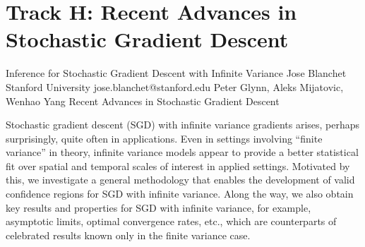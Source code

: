 \section{Track H: Recent Advances in Stochastic Gradient Descent}\newpage

\begin{talk}
  {Inference for Stochastic Gradient Descent with Infinite Variance}%
  {Jose Blanchet}%
  {Stanford University}%
  {jose.blanchet@stanford.edu}%
  {Peter Glynn, Aleks Mijatovic, Wenhao Yang}%
  {Recent Advances in Stochastic Gradient Descent}%
    
                
Stochastic gradient descent (SGD) with infinite variance gradients arises, perhaps surprisingly, quite often in applications. Even in settings involving “finite variance” in theory, infinite variance models appear to provide a better statistical fit over spatial and temporal scales of interest in applied settings. Motivated by this, we investigate a general methodology that enables the development of valid confidence regions for SGD with infinite variance. Along the way, we also obtain key results and properties for SGD with infinite variance, for example, asymptotic limits, optimal convergence rates, etc., which are counterparts of celebrated results known only in the finite variance case.


\medskip


\end{talk}

